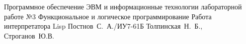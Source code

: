 \documentclass{bmstu}
\begin{document}
	
	{Программное обеспечение ЭВМ и информационные технологии}
	{лабораторной работе №3}
	{Функциональное и логическое программирование}
	{Работа интерпретатора Lisp}
	{}
	{Постнов~С.~А./ИУ7-61Б}
	{Толпинская~Н.~Б., Строганов~Ю.В.}
	
	\maketableofcontents
	
	
	
\end{document}
